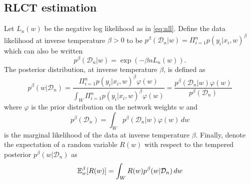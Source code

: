 \documentclass{article} %
\begin{document}
\subsection{RLCT estimation} \label{appendix:RLCT_estimation}


Let $L_n(w)$ be the negative log likelihood as in \eqref{eq:nll}. Define the data likelihood at inverse temperature $\beta >0$ to be $p^\beta(\mathcal D_n | w) = \Pi_{i=1}^n p(y_i |x_i, w)^\beta$ which can also be written 
\begin{equation}
p^\beta(\mathcal D_n | w) = \exp(-\beta n L_n(w)).
\label{general_likelihood}
\end{equation}
The posterior distribution, at inverse temperature $\beta$, is defined as 
\begin{equation}
p^\beta(w|\mathcal D_n) = \frac{\Pi_{i=1}^n p(y_i|x_i,w)^\beta \varphi(w)}{\int_W \Pi_{i=1}^n p(y_i|x_i,w)^\beta \varphi(w)} = \frac{p^\beta(\mathcal D_n|w) \varphi(w)}{p^\beta(\mathcal D_n)}
\label{general_posterior}
\end{equation}
where $\varphi$ is the prior distribution on the network weights $w$ and
\begin{equation}
p^\beta(\mathcal D_n) = \int_W p^\beta(\mathcal D_n|w) \varphi(w) \,dw
\label{general_marginal_likelihood}
\end{equation}
is the marginal likelihood of the data at inverse temperature $\beta$. 
Finally, denote the expectation of a random variable $R(w)$ with respect to the tempered posterior $p^\beta(w|\mathcal D_n)$ as
\begin{equation}
{\mathbb{E}}_w^\beta [R(w)] = \int_W R(w) p^\beta(w|\mathcal D_n) \,dw
\label{general_expectation_posterior}
\end{equation}
\end{document}
